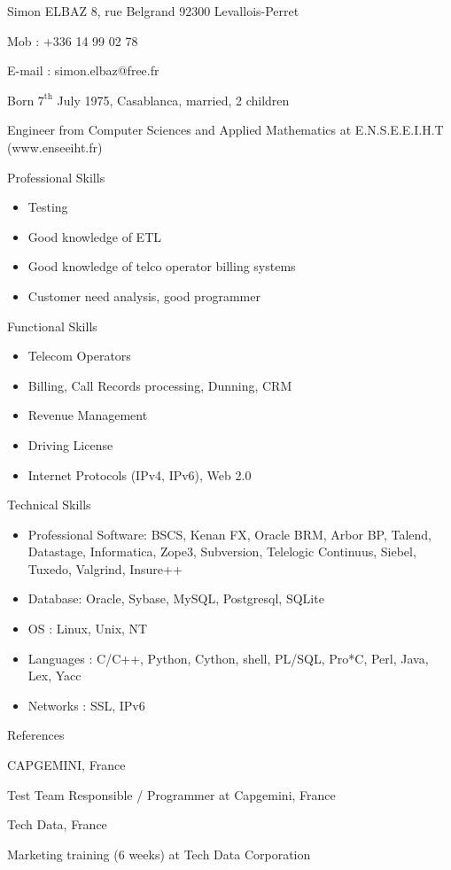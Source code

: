 \documentclass[a4paper,11pt]{letter}
\date{31 July 2008}
\begin{document}
Simon ELBAZ                8, rue Belgrand            92300 Levallois-Perret


Mob :    +336 14 99 02 78

E-mail : simon.elbaz@free.fr

Born $7^\mathrm{th}$ July 1975, Casablanca, married, 2 children

Engineer from Computer Sciences and Applied Mathematics at E.N.S.E.E.I.H.T (www.enseeiht.fr)

Professional Skills
\begin{itemize}
\item    Testing
\item    Good knowledge of ETL
\item    Good knowledge of telco operator billing systems
\item    Customer need analysis, good programmer
\end{itemize}

Functional Skills
\begin{itemize}
\item    Telecom Operators
\item    Billing, Call Records processing, Dunning, CRM
\item    Revenue Management
\item    Driving License
\item    Internet Protocols (IPv4, IPv6), Web 2.0
\end{itemize}

Technical Skills
\begin{itemize}
\item    Professional Software: BSCS, Kenan FX, Oracle BRM, Arbor BP, Talend, Datastage, Informatica, Zope3, Subversion, Telelogic Continuus, Siebel, Tuxedo, Valgrind, Insure++
\item    Database: Oracle, Sybase, MySQL, Postgresql, SQLite
\item    OS : Linux, Unix, NT
\item    Languages : C/C++, Python, Cython, shell, PL/SQL, Pro*C, Perl, Java, Lex, Yacc
\item    Networks : SSL, IPv6
\end{itemize}

References

CAPGEMINI, France
	

Test Team Responsible / Programmer at Capgemini, France
	

Tech Data, France
	

Marketing training (6 weeks) at Tech Data Corporation
\end{document}
